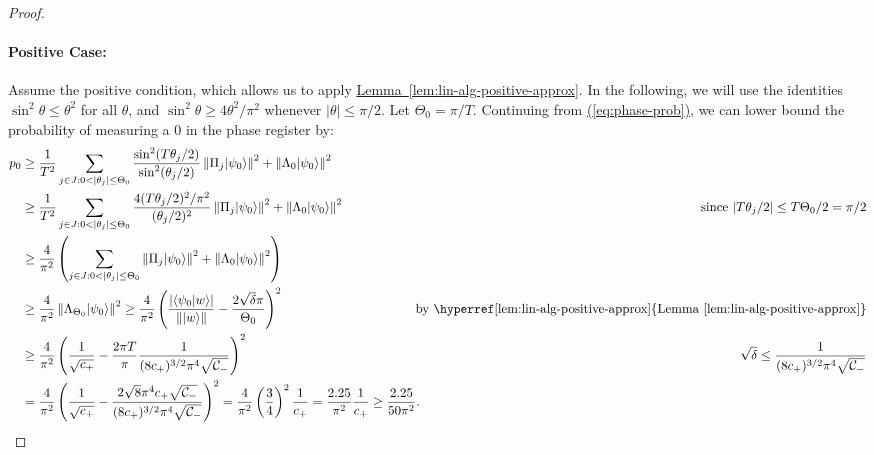\documentclass{theoretics}
\newcommand{\eq}[1]{\hyperref[eq:#1]{(\ref*{eq:#1})}}
\newcommand{\lem}[1]{\hyperref[lem:#1]{Lemma~\ref*{lem:#1}}}
\def\ket#1{{\lvert}#1\rangle}
\renewcommand{\>}{\rangle}
\newcommand{\<}{\langle}
\renewcommand{\(}{\left(}
\renewcommand{\)}{\right)}
\def\braket#1#2{{{\langle}#1\vert}#2\rangle}
\def\norm#1{\left\| #1 \right\|}
\begin{document}
\begin{proof}
\paragraph{Positive Case:} Assume the positive condition, which allows us to apply \lem{lin-alg-positive-approx}. In the following, we will use the identities $\sin^2\theta\leq \theta^2$ for all $\theta$, and $\sin^2\theta\geq 4\theta^2/\pi^2$ whenever $|\theta|\leq \pi/2$. 
Let $\Theta_0=\pi/T$. 
Continuing from \eq{phase-prob}, 
we can lower bound the probability of measuring a 0 in the phase register by:
\begin{align*}
p_0 &\geq \frac{1}{T^2}\sum_{j\in J:0<|\theta_j|\leq\Theta_0}\frac{\sin^2(T\theta_j/2)}{\sin^2(\theta_j/2)}\norm{\Pi_j\ket{\psi_0}}^2+\norm{\Lambda_0\ket{\psi_0}}^2\\
&\geq \frac{1}{T^2} \sum_{j\in J:0<|\theta_j|\leq\Theta_0}\frac{4(T\theta_j/2)^2/\pi^2}{(\theta_j/2)^2}\norm{\Pi_j\ket{\psi_0}}^2+\norm{\Lambda_0\ket{\psi_0}}^2 & \mbox{since }|T\theta_j/2|\leq T\Theta_0/2= \pi/2 \\
&\geq \frac{4}{\pi^2} \left(\sum_{j\in J:0<|\theta_j|\leq\Theta_0}\norm{\Pi_j\ket{\psi_0}}^2+\norm{\Lambda_0\ket{\psi_0}}^2 \right) \\
&\geq \frac{4}{\pi^2}\norm{\Lambda_{\Theta_0}\ket{\psi_0}}^2 \geq \frac{4}{\pi^2}\left(\frac{|\braket{\psi_0}{w}|}{\norm{\ket{w}}}-\frac{2\sqrt{\delta}\pi}{\Theta_0}\right)^2 & \mbox{by \lem{lin-alg-positive-approx}}\\
&\geq \frac{4}{\pi^2}\left(\frac{1}{\sqrt{c_+}}-\frac{2\pi T}{\pi}\frac{1}{(8c_+)^{3/2}\pi^4\sqrt{{\cal C}_-}}\right)^2 & \sqrt{\delta}\leq \frac{1}{(8c_+)^{3/2}\pi^4\sqrt{{\cal C}_-}}\\
&= \frac{4}{\pi^2}\left(\frac{1}{\sqrt{c_+}}-\frac{2\sqrt{8}\pi^4c_+\sqrt{{\cal C}_-}}{(8c_+)^{3/2}\pi^4\sqrt{{\cal C}_-}}\right)^2
= \frac{4}{\pi^2}\left(\frac{3}{4}\right)^2\frac{1}{c_+}
= \frac{2.25}{\pi^2}\frac{1}{c_+} \geq \frac{2.25}{50\pi^2}.\!\!\!\!\!\!\!\!
\end{align*}


\end{proof}
\end{document}
